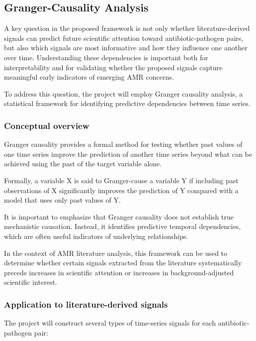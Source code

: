 \documentclass[
]{article}
\begin{document}
\subsection{Granger-Causality
Analysis}\label{granger-causality-analysis}

A key question in the proposed framework is not only whether
literature-derived signals can predict future scientific attention
toward antibiotic-pathogen pairs, but also which signals are most
informative and how they influence one another over time. Understanding
these dependencies is important both for interpretability and for
validating whether the proposed signals capture meaningful early
indicators of emerging AMR concerns.

To address this question, the project will employ Granger causality
analysis, a statistical framework for identifying predictive
dependencies between time series.

\subsubsection{Conceptual overview}\label{51-conceptual-overview}

Granger causality provides a formal method for testing whether past
values of one time series improve the prediction of another time series
beyond what can be achieved using the past of the target variable alone.

Formally, a variable X is said to Granger-cause a variable Y if
including past observations of X significantly improves the prediction
of Y compared with a model that uses only past values of Y.

It is important to emphasize that Granger causality does not establish
true mechanistic causation. Instead, it identifies predictive temporal
dependencies, which are often useful indicators of underlying
relationships.

In the context of AMR literature analysis, this framework can be used to
determine whether certain signals extracted from the literature
systematically precede increases in scientific attention or increases in
background-adjusted scientific interest.

\subsubsection{Application to literature-derived
signals}\label{52-application-to-literature-derived-signals}

The project will construct several types of time-series signals for each
antibiotic-pathogen pair:
\end{document}
